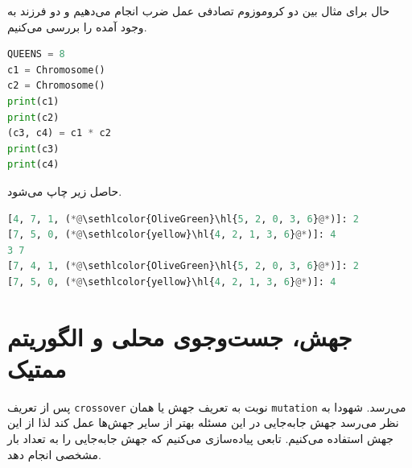 \documentclass[a4paper, 12pt]{article}
\theoremstyle{definition}
\begin{document}
حال برای مثال بین دو کروموزوم تصادفی عمل ضرب انجام می‌دهیم و دو فرزند به وجود آمده را بررسی می‌کنیم.

\LTR
\begin{lstlisting}[language=Python]
QUEENS = 8
c1 = Chromosome()
c2 = Chromosome()
print(c1)
print(c2)
(c3, c4) = c1 * c2
print(c3)
print(c4)
\end{lstlisting}
\RTL

حاصل زیر چاپ می‌شود.

\LTR
\begin{lstlisting}[language=Python]
[4, 7, 1, (*@\sethlcolor{OliveGreen}\hl{5, 2, 0, 3, 6}@*)]: 2
[7, 5, 0, (*@\sethlcolor{yellow}\hl{4, 2, 1, 3, 6}@*)]: 4
3 7
[7, 4, 1, (*@\sethlcolor{OliveGreen}\hl{5, 2, 0, 3, 6}@*)]: 2
[7, 5, 0, (*@\sethlcolor{yellow}\hl{4, 2, 1, 3, 6}@*)]: 4
\end{lstlisting}
\RTL

\section{جهش، جست‌وجوی محلی و الگوریتم ممتیک}
پس از تعریف
\texttt{crossover}
نوبت به تعریف جهش یا همان
\texttt{mutation}
می‌رسد. شهودا به نظر می‌رسد جهش جابه‌جایی در این مسئله بهتر از سایر جهش‌ها عمل کند لذا از این جهش استفاده می‌کنیم. تابعی پیاده‌سازی می‌کنیم که جهش جابه‌جایی را به تعداد بار مشخصی انجام دهد.
\end{document}
